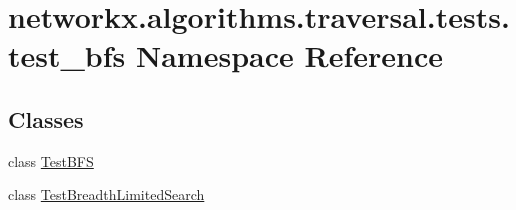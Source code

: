 \hypertarget{namespacenetworkx_1_1algorithms_1_1traversal_1_1tests_1_1test__bfs}{}\section{networkx.\+algorithms.\+traversal.\+tests.\+test\+\_\+bfs Namespace Reference}
\label{namespacenetworkx_1_1algorithms_1_1traversal_1_1tests_1_1test__bfs}
\subsection*{Classes}
\begin{DoxyCompactItemize}
\item 
class \hyperlink{classnetworkx_1_1algorithms_1_1traversal_1_1tests_1_1test__bfs_1_1TestBFS}{Test\+B\+FS}
\item 
class \hyperlink{classnetworkx_1_1algorithms_1_1traversal_1_1tests_1_1test__bfs_1_1TestBreadthLimitedSearch}{Test\+Breadth\+Limited\+Search}
\end{DoxyCompactItemize}
